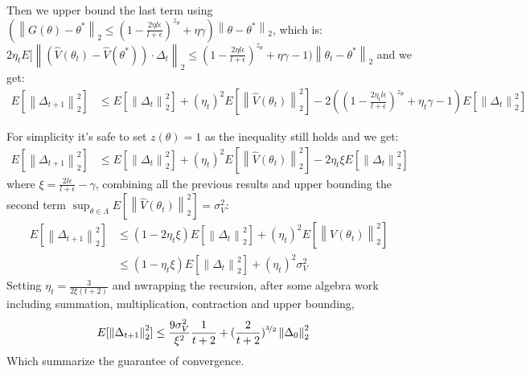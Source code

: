 \documentclass{article}
\begin{document}
  Then we upper bound the last term using $(\left\lVert G(\theta) - \theta^*\right\lVert_2 \leq (1 - \frac{2\eta l \epsilon}{l+ \epsilon})^{z_{\theta}} + \eta \gamma)\left\lVert \theta - \theta^* \right\lVert_2$, which is: $2\eta_t E[\left\lVert(\hat{V}(\theta_{t}) -\hat{V}(\theta^*) )  \cdot \Delta_t \right\lVert_2 \leq (1 - \frac{2\eta l \epsilon}{l+ \epsilon})^{z_{\theta}} + \eta \gamma -1 )\left\lVert \theta_t - \theta^* \right\lVert_2$
and we get:
\begin{equation}
  \begin{aligned}
  E[ \left\lVert\Delta_{t+1}\right\lVert_2^2 ] & \leq E[\left\lVert\Delta_{t}\right\lVert_2^2] + (\eta_t)^2 E[\left\lVert\hat{V}(\theta_{t})\right\lVert_2^2] - 2((1 - \frac{2\eta_t l \epsilon}{l+ \epsilon})^{z_{\theta}} + \eta_t \gamma -1 )E[\left\lVert\Delta_t \right\lVert_2^2]  \nonumber
   \end{aligned}
 \end{equation}

For simplicity it's safe to set $z(\theta) = 1$ as the inequality still holds and we get: 
\begin{equation}
  \begin{aligned}
  E[ \left\lVert\Delta_{t+1}\right\lVert_2^2 ] & \leq E[\left\lVert\Delta_{t}\right\lVert_2^2] + (\eta_t)^2 E[\left\lVert\hat{V}(\theta_{t})\right\lVert_2^2] - 2\eta_t \xi E[\left\lVert\Delta_t \right\lVert_2^2]  \nonumber
   \end{aligned}
 \end{equation}
where $\xi = \frac{2l\epsilon}{l+\epsilon} - \gamma$, combining all the previous results and upper bounding the second term $\sup_{\theta \in \Lambda}E[\left\lVert\hat{V}(\theta_{t})\right\lVert_2^2] = \sigma_{V}^2$:
\begin{equation}
  \begin{aligned}
  E[ \left\lVert\Delta_{t+1}\right\lVert_2^2 ] & \leq (1 - 2\eta_t \xi)E[\left\lVert\Delta_{t}\right\lVert_2^2] + (\eta_t)^2 E[\left\lVert\hat{V}(\theta_{t})\right\lVert_2^2] \nonumber \\
& \leq   (1 - \eta_t \xi)E[\left\lVert\Delta_{t}\right\lVert_2^2] + (\eta_t)^2 \sigma_{V}^2 \nonumber 
  \end{aligned}
\end{equation}
Setting $\eta_t =\frac{3}{2\xi(t+2)}$ and nwrapping the recursion, after some algebra work including summation, multiplication, contraction and upper bounding,
\begin{equation}
  \begin{aligned}
  E[ \left\lVert\Delta_{t+1}\right\lVert_2^2 ] &\leq \frac{9\sigma_{V}^2}{\xi^2} \frac{1}{t+2} + (\frac{2}{t+2})^{\nicefrac{3}{2}} \left\lVert\Delta_{0}\right\lVert_2^2
  \end{aligned}
\end{equation}
Which summarize the guarantee of convergence.
\end{document}
